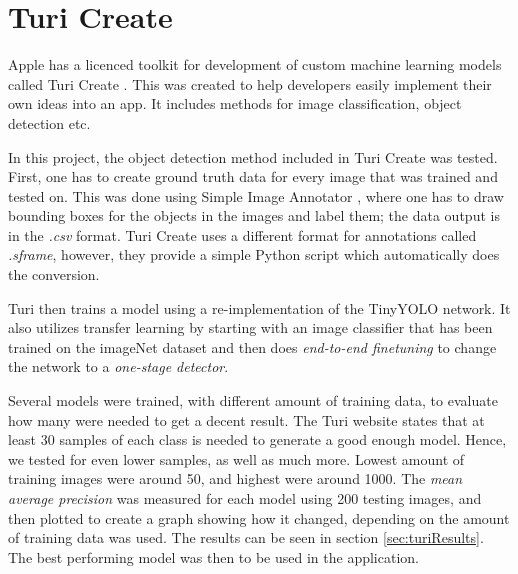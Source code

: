 \section{Turi Create}
\label{sec:turi}
Apple has a licenced toolkit for development of custom machine learning models called Turi Create \cite{turiCreate}. This was created to help developers easily implement their own ideas into an app. It includes methods for image classification, object detection etc.

In this project, the object detection method included in Turi Create was tested. First, one
 has to create ground truth data for every image that was trained and tested on. This was
 done using Simple Image Annotator \cite{simpleImage}, where one has to draw bounding
  boxes for the objects in the images and label them; the data output is in the \textit{.csv} format.  Turi Create uses a different format for annotations called \textit{.sframe},
  however, they provide a simple Python script which automatically does the conversion. 

Turi then trains a model using a re-implementation of the TinyYOLO network. It also utilizes transfer learning by starting with an image classifier that has been trained on the imageNet dataset and then does \textit{end-to-end finetuning} to change the network to a \textit{one-stage detector}.

Several models were trained, with different amount of training data, to evaluate how many
 were needed to get a decent result. The Turi website states that at least 30 samples of
each class is needed to generate a good enough model. Hence, we tested for even lower
samples, as well as much more. Lowest amount of training images were around 50, and
highest  were around 1000. The \textit{mean average precision} was measured for each model using 200 testing images, and then plotted to create a graph showing how it
 changed, depending on the amount of training data was used. The results can be seen in section \ref{sec:turiResults}. The best performing model was then to be used in the application.

